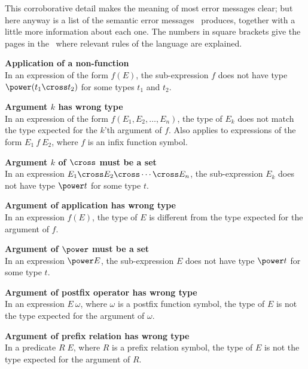 {{{{{{This corroborative detail makes the meaning of most error messages
clear; but here anyway is a list of the semantic error
messages \fuzz\ produces, together with a little more information
about each one.  The numbers in square brackets give the pages in
the \ZRM\ where relevant rules of the language are explained.
\begin{trivlist}
\item[]{\bf Application of a non-function}\\
        In an expression of the form $f(E)$, the sub-expression $f$
        does not have type $\power (t_1 \cross t_2)$ for some types
        $t_1$ and $t_2$.  

\item[]{\bf Argument $k$ has wrong type}\\
        In an expression of the form $f(E_1, E_2, \ldots, E_n)$, the
        type of $E_k$ does not match the type expected for the $k$'th
        argument of $f$. Also applies to expressions of the form
        $E_1\:f\:E_2$, where $f$ is an infix function symbol.

\item[]{\bf Argument $k$ of $\cross$ must be a set}\\
        In an expression $E_1 \cross E_2 \cross \cdots \cross E_n$,
        the sub-expression $E_k$ does not have type $\power t$ for
        some type $t$. 

\item[]{\bf Argument of application has wrong type}\\
        In an expression $f(E)$, the type of $E$ is different from the
        type expected for the argument of $f$. 

\item[]{\bf Argument of $\power$ must be a set}\\
        In an expression $\power E$, the sub-expression $E$ does not
        have type $\power t$ for some type $t$. 

\item[]{\bf Argument of postfix operator has wrong type}\\
        In an expression $E~\omega$, where $\omega$ is a postfix
        function symbol, the type of $E$ is not the type expected
        for the argument of $\omega$. 

\item[]{\bf Argument of prefix relation has wrong type}\\
        In a predicate $R\;E$, where $R$ is a prefix relation symbol,
        the type of $E$ is not the type expected for the argument of
        $R$. 


\end{trivlist}}}}}}}
